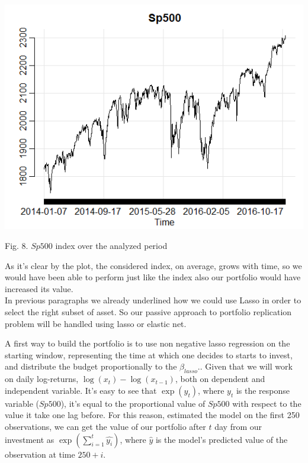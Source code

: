 \documentclass{article}%
\begin{document}
\includegraphics[scale=0.75]{sp500}
\begin{center}
\begin{small}
Fig. 8. $Sp500$ index over the analyzed period
\\

\end{small}
\end{center}

		
As it's clear by the plot, the considered index, on average, grows with time, so we would have been able to perform just like the index also our portfolio would have increased its value.
\\

In previous paragraphs we already underlined how we could use Lasso in order to select the right subset of asset. So our passive approach to portfolio replication problem will be handled using lasso or elastic net.

A first way to build the portfolio is to use non negative lasso regression on the starting window, representing the time at which one decides to starts to invest, and distribute the budget proportionally to the $\beta_{lasso}$.. Given that we will work on daily log-returns, $\log(x_t)-\log(x_{t-1})$, both on dependent and independent variable. It's easy to see that $\exp(y_t)$, where $y_t$ is the response variable ($Sp500$), it's equal to the proportional value of $Sp500$ with respect to the value it take one lag before. For this reason, estimated the model on the first 250 observations, we can get the value of our portfolio after $t$ day from our investment as $\exp(\sum_{i=1}^t \hat{y_i})$, where $\hat{y}$ is the model's predicted value of the observation at time $250+i$.
\end{document}
